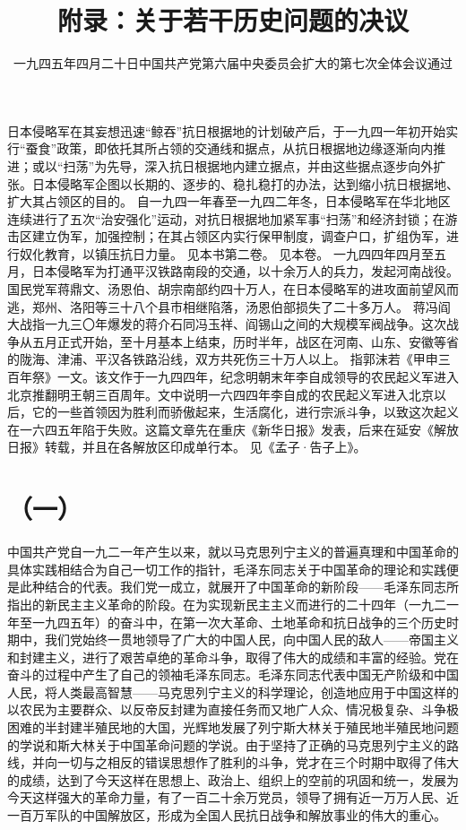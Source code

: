 \begin{maonote}
日本侵略军在其妄想迅速“鲸吞”抗日根据地的计划破产后，于一九四一年初开始实行“蚕食”政策，即依托其所占领的交通线和据点，从抗日根据地边缘逐渐向内推进；或以“扫荡”为先导，深入抗日根据地内建立据点，并由这些据点逐步向外扩张。日本侵略军企图以长期的、逐步的、稳扎稳打的办法，达到缩小抗日根据地、扩大其占领区的目的。
自一九四一年春至一九四二年冬，日本侵略军在华北地区连续进行了五次“治安强化”运动，对抗日根据地加紧军事“扫荡”和经济封锁；在游击区建立伪军，加强控制；在其占领区内实行保甲制度，调查户口，扩组伪军，进行奴化教育，以镇压抗日力量。
见本书第二卷。
见本卷。
一九四四年四月至五月，日本侵略军为打通平汉铁路南段的交通，以十余万人的兵力，发起河南战役。国民党军蒋鼎文、汤恩伯、胡宗南部约四十万人，在日本侵略军的进攻面前望风而逃，郑州、洛阳等三十八个县市相继陷落，汤恩伯部损失了二十多万人。
蒋冯阎大战指一九三〇年爆发的蒋介石同冯玉祥、阎锡山之间的大规模军阀战争。这次战争从五月正式开始，至十月基本上结束，历时半年，战区在河南、山东、安徽等省的陇海、津浦、平汉各铁路沿线，双方共死伤三十万人以上。
指郭沫若《甲申三百年祭》一文。该文作于一九四四年，纪念明朝末年李自成领导的农民起义军进入北京推翻明王朝三百周年。文中说明一六四四年李自成的农民起义军进入北京以后，它的一些首领因为胜利而骄傲起来，生活腐化，进行宗派斗争，以致这次起义在一六四五年陷于失败。这篇文章先在重庆《新华日报》发表，后来在延安《解放日报》转载，并且在各解放区印成单行本。
见《孟子·告子上》。
\end{maonote}


\mxendarticle


\title{附录：关于若干历史问题的决议}
\date{一九四五年四月二十日中国共产党第六届中央委员会扩大的第七次全体会议通过}
\maketitle


\section*{（一）}

中国共产党自一九二一年产生以来，就以马克思列宁主义的普遍真理和中国革命的具体实践相结合为自己一切工作的指针，毛泽东同志关于中国革命的理论和实践便是此种结合的代表。我们党一成立，就展开了中国革命的新阶段——毛泽东同志所指出的新民主主义革命的阶段。在为实现新民主主义而进行的二十四年（一九二一年至一九四五年）的奋斗中，在第一次大革命、土地革命和抗日战争的三个历史时期中，我们党始终一贯地领导了广大的中国人民，向中国人民的敌人——帝国主义和封建主义，进行了艰苦卓绝的革命斗争，取得了伟大的成绩和丰富的经验。党在奋斗的过程中产生了自己的领袖毛泽东同志。毛泽东同志代表中国无产阶级和中国人民，将人类最高智慧——马克思列宁主义的科学理论，创造地应用于中国这样的以农民为主要群众、以反帝反封建为直接任务而又地广人众、情况极复杂、斗争极困难的半封建半殖民地的大国，光辉地发展了列宁斯大林关于殖民地半殖民地问题的学说和斯大林关于中国革命问题的学说。由于坚持了正确的马克思列宁主义的路线，并向一切与之相反的错误思想作了胜利的斗争，党才在三个时期中取得了伟大的成绩，达到了今天这样在思想上、政治上、组织上的空前的巩固和统一，发展为今天这样强大的革命力量，有了一百二十余万党员，领导了拥有近一万万人民、近一百万军队的中国解放区，形成为全国人民抗日战争和解放事业的伟大的重心。

